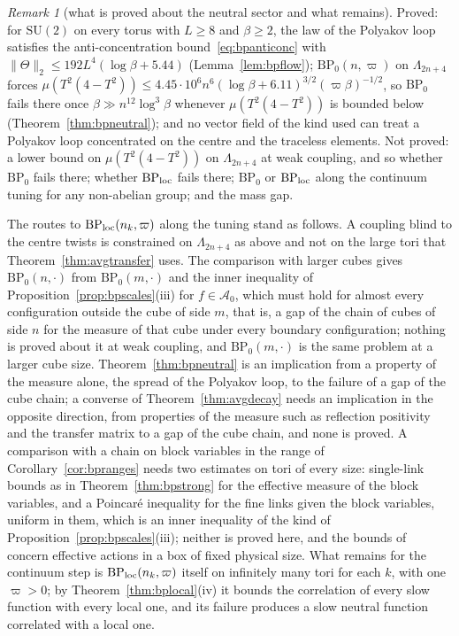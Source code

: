 \documentclass[aps,prd,twocolumn,superscriptaddress,nofootinbib,longbibliography,floatfix,amsmath,amssymb,10pt]{revtex4-2}
\theoremstyle{definition}
\theoremstyle{remark}
\newtheorem{remark}[theorem]{Remark}
\newcommand{\SU}{\mathrm{SU}}
\begin{document}
\begin{remark}[what is proved about the neutral sector and what
remains]\label{rem:bpneutralstatus}
Proved: for $\SU(2)$ on every torus with $L\ge8$ and $\beta\ge2$, the law of
the Polyakov loop satisfies the anti-concentration
bound~\eqref{eq:bpanticonc} with $\lVert\Theta\rVert_2\le192L^4(\log\beta+
5.44)$ (Lemma~\ref{lem:bpflow}); $\mathrm{BP}_0(n,\varpi)$ on
$\Lambda_{2n+4}$ forces $\mu(T^2(4-T^2))\le4.45\cdot10^6n^6(\log\beta+6.11
)^{3/2}(\varpi\beta)^{-1/2}$, so $\mathrm{BP}_0$ fails there once $\beta\gg
n^{12}\log^3\beta$ whenever $\mu(T^2(4-T^2))$ is bounded below
(Theorem~\ref{thm:bpneutral}); and no vector field of the kind used can
treat a Polyakov loop concentrated on the centre and the traceless
elements. Not proved: a lower bound on $\mu(T^2(4-T^2))$ on $\Lambda_{2n+4}$
at weak coupling, and so whether $\mathrm{BP}_0$ fails there; whether
$\mathrm{BP}_{\rm loc}$ fails there; $\mathrm{BP}_0$ or $\mathrm{BP}_{\rm
loc}$ along the continuum tuning for any non-abelian group; and the mass gap.

The routes to $\mathrm{BP}_{\rm loc}(n_k,\varpi)$ along the tuning stand as
follows. A coupling blind to the centre twists is constrained on
$\Lambda_{2n+4}$ as above and not on the large tori that
Theorem~\ref{thm:avgtransfer} uses. The comparison with larger cubes gives
$\mathrm{BP}_0(n,\cdot)$ from $\mathrm{BP}_0(m,\cdot)$ and the inner
inequality of Proposition~\ref{prop:bpscales}(iii) for $f\in\mathcal A_0$,
which must hold for almost every configuration outside the cube of side $m$,
that is, a gap of the chain of cubes of side $n$ for the measure of that
cube under every boundary configuration; nothing is proved about it at weak
coupling, and $\mathrm{BP}_0(m,\cdot)$ is the same problem at a larger cube
size. Theorem~\ref{thm:bpneutral} is an implication from a property of the
measure alone, the spread of the Polyakov loop, to the failure of a gap of
the cube chain; a converse of Theorem~\ref{thm:avgdecay} needs an implication
in the opposite direction, from properties of the measure such as
reflection positivity and the transfer matrix to a gap of the cube chain,
and none is proved. A comparison with a chain on block variables in the
range of Corollary~\ref{cor:bpranges} needs two estimates on tori of every
size: single-link bounds as in Theorem~\ref{thm:bpstrong} for the effective
measure of the block variables, and a Poincar\'e inequality for the fine
links given the block variables, uniform in them, which is an inner
inequality of the kind of Proposition~\ref{prop:bpscales}(iii); neither is
proved here, and the bounds of~\cite{Bal84a,Bal85a,Bal89b} concern effective
actions in a box of fixed physical size. What remains for the continuum
step is $\mathrm{BP}_{\rm loc}(n_k,\varpi)$ itself on infinitely many tori
for each $k$, with one $\varpi>0$; by Theorem~\ref{thm:bplocal}(iv) it
bounds the correlation of every slow function with every local one, and its
failure produces a slow neutral function correlated with a local one.
\end{remark}
\end{document}

